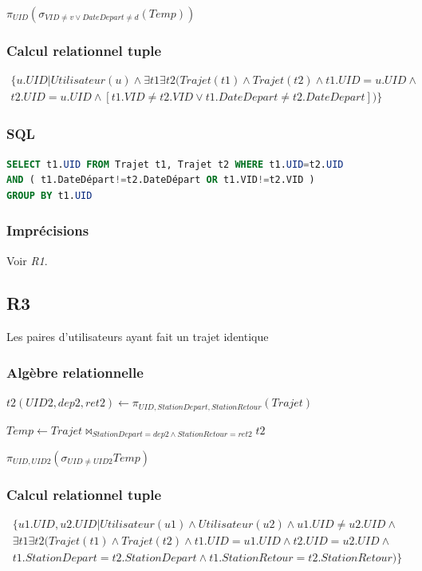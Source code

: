 \documentclass[a4paper, 12pt]{report}
\begin{document}
$\pi_{UID}( \sigma_{VID\neq v\vee DateDepart\neq d}(Temp)  )$

\subsubsection*{Calcul relationnel tuple}

\begin{multline*}
\{ u.UID|Utilisateur(u)\wedge\exists t1\exists t2 ( Trajet(t1)\wedge Trajet(t2)\wedge t1.UID=u.UID\wedge \\
t2.UID=u.UID \wedge [t1.VID\neq t2.VID\vee t1.DateDepart\neq t2.DateDepart] )  \}
\end{multline*}

\subsubsection*{SQL}
\begin{lstlisting}[language=sql]
SELECT t1.UID FROM Trajet t1, Trajet t2 WHERE t1.UID=t2.UID
AND ( t1.DateDépart!=t2.DateDépart OR t1.VID!=t2.VID ) 
GROUP BY t1.UID
\end{lstlisting}

\subsubsection*{Imprécisions}

Voir \textit{R1}.

\subsection*{R3}

Les paires d'utilisateurs ayant fait un trajet identique
\subsubsection*{Algèbre relationnelle}

$t2(UID2,dep2,ret2)\leftarrow\pi_{UID,StationDepart,StationRetour}(Trajet)$

$Temp\leftarrow Trajet\bowtie_{StationDepart=dep2\wedge StationRetour=ret2}t2$

$\pi_{UID,UID2}(\sigma_{UID\neq UID2} Temp)$

\subsubsection*{Calcul relationnel tuple}

\begin{multline*}
\{  u1.UID, u2.UID |Utilisateur(u1)\wedge Utilisateur(u2)\wedge u1.UID \neq u2.UID\wedge \\
\exists t1\exists t2 ( Trajet(t1)\wedge Trajet(t2) \wedge
 t1.UID=u1.UID \wedge t2.UID=u2.UID \wedge \\
  t1.StationDepart=t2.StationDepart \wedge t1.StationRetour=t2.StationRetour )  \}
\end{multline*}
\end{document}
